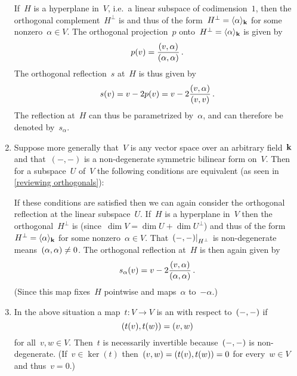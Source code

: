 \begin{recall}
\begin{enumerate}
      If~$H$ is a hyperplane in~$V$, i.e.\ a linear subspace of codimension~$1$, then the orthogonal complement~$H^\perp$ is {\onedimensional} and thus of the form~$H^\perp = \langle\alpha\rangle_{\mathbf{k}}$ for some nonzero~$\alpha \in V$.
      The orthogonal projection~$p$ onto~$H^\perp = \langle\alpha\rangle_{\mathbf{k}}$ is given by
      \[
        p(v)
        =
        \frac{(v,\alpha)}{(\alpha,\alpha)} \,.
      \]
      The orthogonal reflection~$s$ at~$H$ is thus given by
      \[
        s(v)
        =
        v - 2 p(v)
        =
        v - 2 \frac{(v,\alpha)}{(v,v)} \,.
      \]
      The reflection at~$H$ can thus be parametrized by~$\alpha$, and can therefore be denoted by~$s_\alpha$.
    \item
      Suppose more generally that~$V$ is any vector space over an arbitrary field~$\mathbf{k}$ and that~$(-,-)$ is a non-degenerate symmetric bilinear form on~$V$.
      Then for a subspace~$U$ of~$V$ the following conditions are equivalent (as seen in \cref{reviewing orthogonals}):
      If these conditions are satisfied then we can again consider the orthogonal reflection at the linear subspace~$U$.
      If~$H$ is a hyperplane in~$V$ then the orthogonal~$H^{\perp}$ is {\onedimensional} (since~$\dim V = \dim U + \dim U^\perp$) and thus of the form~$H^{\perp} = \langle\alpha\rangle_{\mathbf{k}}$ for some nonzero~$\alpha \in V$.
      That~$\restrict{\inner{-,-}}{H^\perp}$ is non-degenerate means~$(\alpha, \alpha) \neq 0$.
      The orthogonal reflection at~$H$ is then again given by
      \[
        s_\alpha(v)
        =
        v - 2 \frac{(v,\alpha)}{(\alpha,\alpha)} \,.
      \]
      (Since this map fixes~$H$ pointwise and maps~$\alpha$ to~$-\alpha$.)
    \item
      In the above situation a map~$t \colon V \to V$ is an  with respect to~$(-,-)$ if
      \[
        (t(v), t(w))
        =
        (v,w)
      \]
      for all~$v, w \in V$.
      Then~$t$ is necessarily invertible because~$(-,-)$ is non-degenerate.
      (If~$v \in \ker(t)$ then~$(v,w) = (t(v),t(w)) = 0$ for every~$w \in V$ and thus~$v = 0$.)
      

\end{enumerate}
\end{recall}
